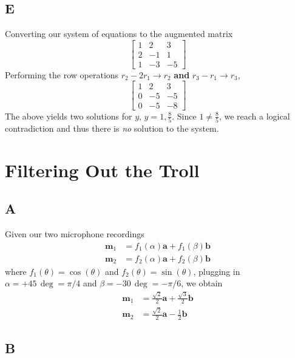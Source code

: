 \documentclass[]{article}
\begin{document}
\subsection{E}

Converting our system of equations to the augmented matrix
\begin{equation}
	\left[
	\begin{array}{cc|c}
	1 & 2 & 3 \\
	2 & -1 & 1 \\
	1 & -3 & -5
	\end{array}
	\right]
\end{equation}
Performing the row operations \(r_2 - 2r_1 \to r_2\) \textbf{and} \(r_3 - r_1 \to r_3\),
\begin{equation}
	\left[
	\begin{array}{cc|c}
	1 & 2 & 3 \\
	0 & -5 & -5 \\
	0 & -5 & -8
	\end{array}
	\right]
\end{equation}
The above yields two solutions for \(y\), \(y = 1, \frac{8}{5}\). Since \(1 \neq \frac{8}{5}\), we reach a logical contradiction and thus there is \emph{no} solution to the system. 

\section{Filtering Out the Troll}

\subsection{A}

Given our two microphone recordings
\begin{align}
	\mathbf{m}_1 &= f_1(\alpha) \mathbf{a} + f_1(\beta) \mathbf{b} \\
	\mathbf{m}_2 &= f_2(\alpha) \mathbf{a} + f_2(\beta) \mathbf{b}
\end{align}
where \(f_1(\theta) = \cos(\theta)\) and \(f_2(\theta) = \sin(\theta)\), plugging in \(\alpha = +45 \, \deg = \pi/4\) and \(\beta = -30 \, \deg = -\pi/6\), we obtain
\begin{align}
	\mathbf{m}_1 &= \frac{\sqrt{2}}{2} \mathbf{a} + \frac{\sqrt{3}}{2} \mathbf{b} \\
	\mathbf{m}_2 &= \frac{\sqrt{2}}{2} \mathbf{a} - \frac{1}{2} \mathbf{b}
\end{align}

\subsection{B}
\end{document}
